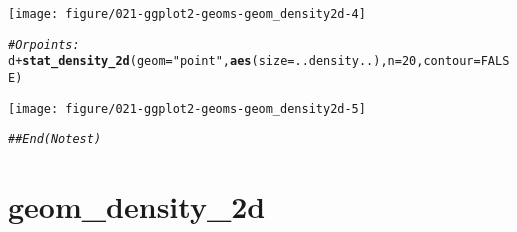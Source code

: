 \documentclass[a4paper,titlepage]{tufte-handout}\usepackage[]{graphicx}\usepackage[]{color}
\makeatletter
\def\maxwidth{ %
  \ifdim\Gin@nat@width>\linewidth
    \linewidth
  \else
    \Gin@nat@width
  \fi
}
\newcommand{\hlnum}[1]{\textcolor[rgb]{0.686,0.059,0.569}{#1}}%
\newcommand{\hlstr}[1]{\textcolor[rgb]{0.192,0.494,0.8}{#1}}%
\newcommand{\hlcom}[1]{\textcolor[rgb]{0.678,0.584,0.686}{\textit{#1}}}%
\newcommand{\hlopt}[1]{\textcolor[rgb]{0,0,0}{#1}}%
\newcommand{\hlstd}[1]{\textcolor[rgb]{0.345,0.345,0.345}{#1}}%
\newcommand{\hlkwc}[1]{\textcolor[rgb]{0.333,0.667,0.333}{#1}}%
\newcommand{\hlkwd}[1]{\textcolor[rgb]{0.737,0.353,0.396}{\textbf{#1}}}%
\newenvironment{kframe}{%
 \def\at@end@of@kframe{}%
 \ifinner\ifhmode%
  \def\at@end@of@kframe{\end{minipage}}%
  \begin{minipage}{\columnwidth}%
 \fi\fi%
 \def\FrameCommand##1{\hskip\@totalleftmargin \hskip-\fboxsep
 \colorbox{shadecolor}{##1}\hskip-\fboxsep
     \hskip-\linewidth \hskip-\@totalleftmargin \hskip\columnwidth}%
 \MakeFramed {\advance\hsize-\width
   \@totalleftmargin\z@ \linewidth\hsize
   \@setminipage}}%
 {\par\unskip\endMakeFramed%
 \at@end@of@kframe}
\newenvironment{knitrout}{}{} %
\makeatother
\begin{document}
\begin{knitrout}
\begin{kframe}
\begin{alltt}
\end{alltt}
\end{kframe}
\texttt{[image: figure/021-ggplot2-geoms-geom\_density2d-4]} 
\begin{kframe}\begin{alltt}
\hlcom{# Or points:}
\hlstd{d} \hlopt{+} \hlkwd{stat_density_2d}\hlstd{(}\hlkwc{geom} \hlstd{=} \hlstr{"point"}\hlstd{,} \hlkwd{aes}\hlstd{(}\hlkwc{size} \hlstd{= ..density..),} \hlkwc{n} \hlstd{=} \hlnum{20}\hlstd{,} \hlkwc{contour} \hlstd{=} \hlnum{FALSE}\hlstd{)}
\end{alltt}
\end{kframe}
\texttt{[image: figure/021-ggplot2-geoms-geom\_density2d-5]} 
\begin{kframe}\begin{alltt}
\hlcom{## End(No test)}
\end{alltt}
\end{kframe}
\end{knitrout}


\section{geom\_density\_2d}
\end{document}
